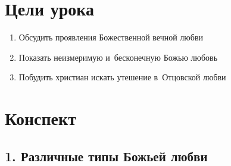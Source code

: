 \documentclass[a4paper,12pt]{article}
\begin{document}
\section*{Цели урока}
\begin{enumerate}
    \item Обсудить проявления Божественной вечной любви
\item Показать неизмеримую и~бесконечную Божью любовь 
\item Побудить христиан искать утешение в~Отцовской любви
\end{enumerate}

\section*{Конспект}

\subsection{1. Различные типы Божьей любви}
\end{document}

